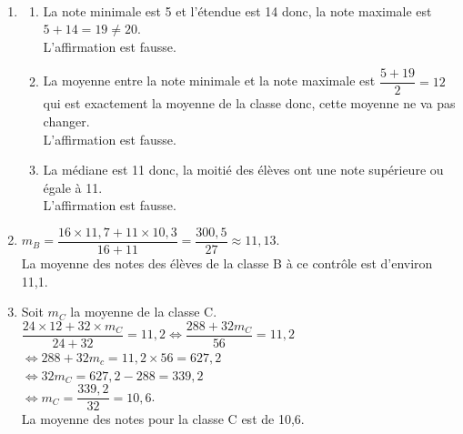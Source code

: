 \begin{corrige}
\ \\ [-5mm]
   \begin{enumerate}
      \item
         \begin{enumerate}
            \item La note minimale est 5 et l'étendue est 14 donc, la note maximale est $5+14 =19\neq20$. \\
               {\blue L'affirmation est fausse}.
            \item La moyenne entre la note minimale et la note maximale est $\dfrac{5+19}{2} =12$ qui est exactement la moyenne de la classe donc, cette moyenne ne va pas changer. \\
               {\blue L'affirmation est fausse}.
            \item La médiane est 11 donc, la moitié des élèves ont une note supérieure ou égale à 11. \\
               {\blue L'affirmation est fausse}. \medskip
         \end{enumerate}
      \setcounter{enumi}{1}
      \item $m_B =\dfrac{16\times11,7+11\times10,3}{16+11} =\dfrac{300,5}{27} \approx11,13$. \\ [1mm]
         {\blue La moyenne des notes des élèves de la classe B à ce contrôle est d'environ 11,1}. \smallskip
      \item Soit $m_C$ la moyenne de la classe C. \\ [1mm]
         $\dfrac{24\times12+32\times m_C}{24+32} =11,2 \iff \dfrac{288+32m_C}{56} =11,2$ \\ [2mm]
         \hspace*{3.8cm} $\iff 288+32m_c =11,2\times56 =627,2$ \\ [1mm]
         \hspace*{3.8cm} $\iff 32m_C =627,2-288 =339,2$ \\ [2mm]
         \hspace*{3.8cm} $\iff m_C =\dfrac{339,2}{32} =10,6$. \\ [2mm]
         {\blue La moyenne des notes pour la classe C est de 10,6}.
   \end{enumerate}
\end{corrige}

\bigskip


